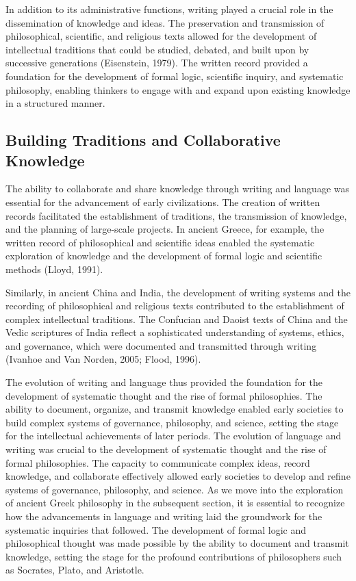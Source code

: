 \documentclass[twocolumn]{article}
\begin{document}
\textcolor{secondary}{In addition to its administrative functions, writing played a crucial role in the dissemination of knowledge and ideas. The preservation and transmission of philosophical, scientific, and religious texts allowed for the development of intellectual traditions that could be studied, debated, and built upon by successive generations (Eisenstein, 1979). The written record provided a foundation for the development of formal logic, scientific inquiry, and systematic philosophy, enabling thinkers to engage with and expand upon existing knowledge in a structured manner.}

\subsection{Building Traditions and Collaborative Knowledge}

\textcolor{primary}{The ability to collaborate and share knowledge through writing and language was essential for the advancement of early civilizations. The creation of written records facilitated the establishment of traditions, the transmission of knowledge, and the planning of large-scale projects. In ancient Greece, for example, the written record of philosophical and scientific ideas enabled the systematic exploration of knowledge and the development of formal logic and scientific methods (Lloyd, 1991).}

\textcolor{secondary}{Similarly, in ancient China and India, the development of writing systems and the recording of philosophical and religious texts contributed to the establishment of complex intellectual traditions. The Confucian and Daoist texts of China and the Vedic scriptures of India reflect a sophisticated understanding of systems, ethics, and governance, which were documented and transmitted through writing (Ivanhoe and Van Norden, 2005; Flood, 1996).}

\textcolor{primary}{The evolution of writing and language thus provided the foundation for the development of systematic thought and the rise of formal philosophies. The ability to document, organize, and transmit knowledge enabled early societies to build complex systems of governance, philosophy, and science, setting the stage for the intellectual achievements of later periods.}
\textcolor{secondary}{The evolution of language and writing was crucial to the development of systematic thought and the rise of formal philosophies. The capacity to communicate complex ideas, record knowledge, and collaborate effectively allowed early societies to develop and refine systems of governance, philosophy, and science. As we move into the exploration of ancient Greek philosophy in the subsequent section, it is essential to recognize how the advancements in language and writing laid the groundwork for the systematic inquiries that followed. The development of formal logic and philosophical thought was made possible by the ability to document and transmit knowledge, setting the stage for the profound contributions of philosophers such as Socrates, Plato, and Aristotle.}
\end{document}
